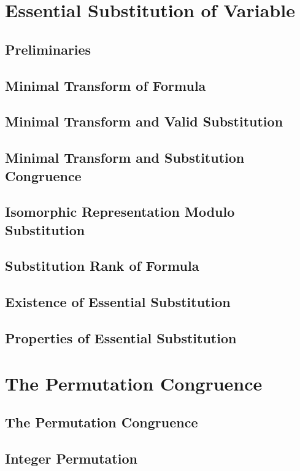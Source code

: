 \section{Essential Substitution of Variable}
    \subsection{Preliminaries}
      
    \subsection{Minimal Transform of Formula}
      
    \subsection{Minimal Transform and Valid Substitution}
      
    \subsection{Minimal Transform and Substitution Congruence}
      
    \subsection{Isomorphic Representation Modulo Substitution}
      
    \subsection{Substitution Rank of Formula}
      
    \subsection{Existence of Essential Substitution}
      
    \subsection{Properties of Essential Substitution}
      
\section{The Permutation Congruence}
    \subsection{The Permutation Congruence}
      
    \subsection{Integer Permutation}
      
